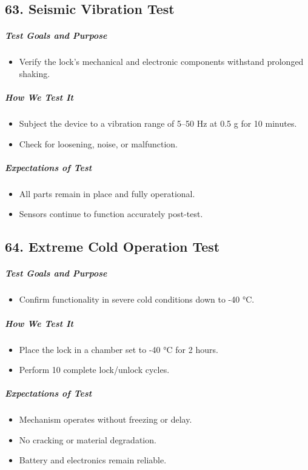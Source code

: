 \subsection*{63. Seismic Vibration Test}
\subparagraph{Test Goals and Purpose}
\begin{itemize}
    \item Verify the lock’s mechanical and electronic components withstand prolonged shaking.
\end{itemize}
\subparagraph{How We Test It}
\begin{itemize}
    \item Subject the device to a vibration range of 5–50 Hz at 0.5 g for 10 minutes.
    \item Check for loosening, noise, or malfunction.
\end{itemize}
\subparagraph{Expectations of Test}
\begin{itemize}
    \item All parts remain in place and fully operational.
    \item Sensors continue to function accurately post-test.
\end{itemize}

\subsection*{64. Extreme Cold Operation Test}
\subparagraph{Test Goals and Purpose}
\begin{itemize}
    \item Confirm functionality in severe cold conditions down to -40 °C.
\end{itemize}
\subparagraph{How We Test It}
\begin{itemize}
    \item Place the lock in a chamber set to -40 °C for 2 hours.
    \item Perform 10 complete lock/unlock cycles.
\end{itemize}
\subparagraph{Expectations of Test}
\begin{itemize}
    \item Mechanism operates without freezing or delay.
    \item No cracking or material degradation.
    \item Battery and electronics remain reliable.
\end{itemize}

